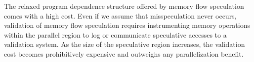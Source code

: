 The relaxed program dependence structure offered by memory flow
speculation comes with a high cost.
Even if we assume that misspeculation never occurs,
%
validation of memory flow speculation requires instrumenting memory
operations within the parallel region to log or communicate
speculative accesses to a validation system. As the size of the
speculative region increases, the validation cost becomes
prohibitively expensive and outweighs any parallelization benefit.
%



%
%

